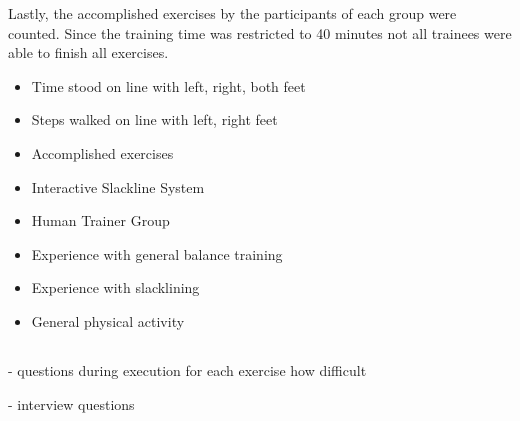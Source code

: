 Lastly, the accomplished exercises by the participants of each group were counted. Since the training time was restricted to 40 minutes not all trainees were able to finish all exercises.

\begin{itemize}
\item Time stood on line with left, right, both feet
\item Steps walked on line with left, right feet
\item Accomplished exercises
\end{itemize}

\begin{itemize}
\item Interactive Slackline System
\item Human Trainer Group
\end{itemize}

\begin{itemize}
\item Experience with general balance training
\item Experience with slacklining
\item General physical activity
\end{itemize}


\subsection{}
- questions during execution for each exercise how difficult

- interview questions


